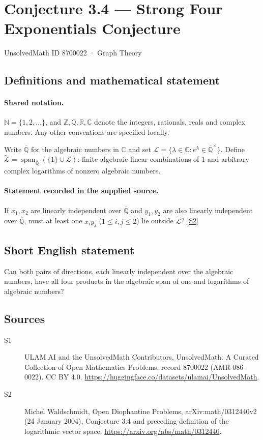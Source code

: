 \documentclass[11pt]{article}
\newcommand{\sref}[2]{\hyperlink{source:#1:#2}{[S#2]}}
\begin{document}
\setcounter{section}{8700021}
\section{Conjecture 3.4 — Strong Four Exponentials Conjecture}\label{8700022}
{\small\sffamily UnsolvedMath ID 8700022 · Graph Theory}
\subsection{Definitions and mathematical statement}

\paragraph{Shared notation.}$\mathbb N=\{1,2,\ldots\}$, and $\mathbb Z,\mathbb Q,\mathbb R,\mathbb C$ denote the integers, rationals, reals and complex numbers. Any other conventions are specified locally.


Write $\overline{\mathbb Q}$ for the algebraic numbers in $\mathbb C$ and set $\mathcal L=\{\lambda\in\mathbb C:e^\lambda\in\overline{\mathbb Q}^{\times}\}$. Define $\widetilde{\mathcal L}=\operatorname{span}_{\overline{\mathbb Q}}(\{1\}\cup\mathcal L)$: finite algebraic linear combinations of $1$ and arbitrary complex logarithms of nonzero algebraic numbers.
\paragraph{Statement recorded in the supplied source.}
If $x_1,x_2$ are linearly independent over $\overline{\mathbb Q}$ and $y_1,y_2$ are also linearly independent over $\overline{\mathbb Q}$, must at least one $x_i y_j$ ($1\le i,j\le2$) lie outside $\widetilde{\mathcal L}$? \sref{8700022}{2}
\subsection{Short English statement}
Can both pairs of directions, each linearly independent over the algebraic numbers, have all four products in the algebraic span of one and logarithms of algebraic numbers?
\subsection{Sources}
\begin{description}
\item[\hypertarget{source:8700022:1}{S1}] ULAM.AI and the UnsolvedMath Contributors, UnsolvedMath: A Curated Collection of Open Mathematics Problems, record 8700022 (AMR-086-0022). CC BY 4.0. \url{https://huggingface.co/datasets/ulamai/UnsolvedMath}.
\item[\hypertarget{source:8700022:2}{S2}] Michel Waldschmidt, Open Diophantine Problems, arXiv:math/0312440v2 (24 January 2004), Conjecture 3.4 and preceding definition of the logarithmic vector space. \url{https://arxiv.org/abs/math/0312440}.
\end{description}
\label{end:8700022}
\end{document}
